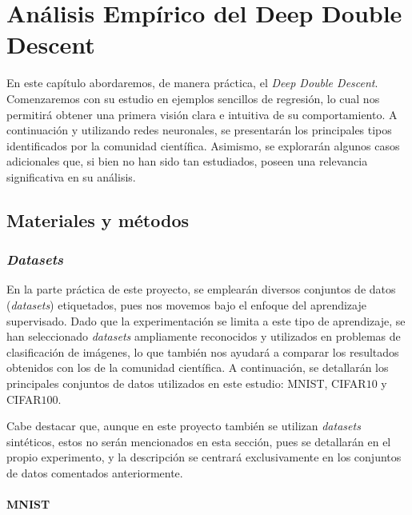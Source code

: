 
\chapter{Análisis Empírico del Deep Double Descent}\label{ch:analisis-empirico-ddd}

En este capítulo abordaremos, de manera práctica, el \textit{Deep Double Descent}. Comenzaremos con su estudio en ejemplos sencillos de regresión, lo cual nos permitirá obtener una primera visión clara e intuitiva de su comportamiento. A continuación y utilizando redes neuronales, se presentarán los principales tipos identificados por la comunidad científica. Asimismo, se explorarán algunos casos adicionales que, si bien no han sido tan estudiados, poseen una relevancia significativa en su análisis.

\section{Materiales y métodos}\label{sec:materiales-y-metodos}

\subsection{\textit{Datasets}}\label{subsec:datasets}

En la parte práctica de este proyecto, se emplearán diversos conjuntos de datos (\textit{datasets}) etiquetados, pues nos movemos bajo el enfoque del aprendizaje supervisado. Dado que la experimentación se limita a este tipo de aprendizaje, se han seleccionado \textit{datasets} ampliamente reconocidos y utilizados en problemas de clasificación de imágenes, lo que también nos ayudará a comparar los resultados obtenidos con los de la comunidad científica. A continuación, se detallarán los principales conjuntos de datos utilizados en este estudio: MNIST, CIFAR$10$ y CIFAR$100$.

Cabe destacar que, aunque en este proyecto también se utilizan \textit{datasets} sintéticos, estos no serán mencionados en esta sección, pues se detallarán en el propio experimento, y la descripción se centrará exclusivamente en los conjuntos de datos comentados anteriormente.

\subsubsection{MNIST}\label{subsubsec:MNIST}

